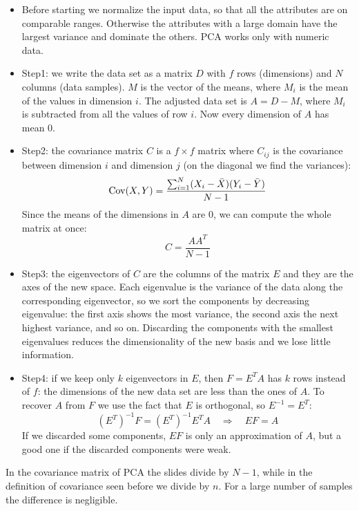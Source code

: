 \begin{itemize}
    \item Before starting we normalize the input data, so that all the attributes are on comparable ranges. Otherwise the attributes with a large domain have the largest variance and dominate the others. PCA works only with numeric data.
    \item Step1: we write the data set as a matrix $D$ with $f$ rows (dimensions) and $N$ columns (data samples). $M$ is the vector of the means, where $M_i$ is the mean of the values in dimension $i$. The adjusted data set is $A = D - M$, where $M_i$ is subtracted from all the values of row $i$. Now every dimension of $A$ has mean 0.
    \item Step2: the covariance matrix $C$ is a $f \times f$ matrix where $C_{ij}$ is the covariance between dimension $i$ and dimension $j$ (on the diagonal we find the variances):
    \[
        \operatorname{Cov}(X,Y) = \frac{\sum_{i=1}^{N}(X_i-\bar{X})(Y_i-\bar{Y})}{N-1}
    \]
    Since the means of the dimensions in $A$ are 0, we can compute the whole matrix at once:
    \[
        C = \frac{AA^T}{N-1}
    \]
    \item Step3: the eigenvectors of $C$ are the columns of the matrix $E$ and they are the axes of the new space. Each eigenvalue is the variance of the data along the corresponding eigenvector, so we sort the components by decreasing eigenvalue: the first axis shows the most variance, the second axis the next highest variance, and so on. Discarding the components with the smallest eigenvalues reduces the dimensionality of the new basis and we lose little information.
    \item Step4: if we keep only $k$ eigenvectors in $E$, then $F=E^TA$ has $k$ rows instead of $f$: the dimensions of the new data set are less than the ones of $A$. To recover $A$ from $F$ we use the fact that $E$ is orthogonal, so $E^{-1}=E^T$:
    \[
        (E^T)^{-1}F = (E^T)^{-1}E^TA \quad\Longrightarrow\quad EF = A
    \]
    If we discarded some components, $EF$ is only an approximation of $A$, but a good one if the discarded components were weak.
\end{itemize}

\begin{remark}
In the covariance matrix of PCA the slides divide by $N-1$, while in the definition of covariance seen before we divide by $n$. For a large number of samples the difference is negligible.
\end{remark}

